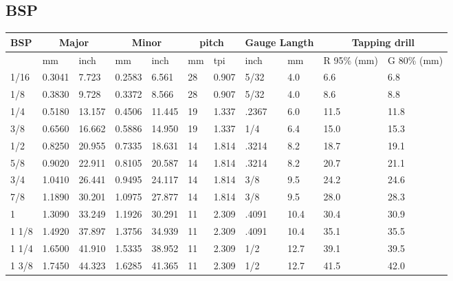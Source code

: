\subsection{BSP}
\begin{table}[h!]
    \footnotesize
\begin{longtable}{l|ll|ll|ll|ll|ll}
    BSP
    &\multicolumn{2}{c}{Major}
    &\multicolumn{2}{c}{Minor}
    &\multicolumn{2}{c}{pitch}
    &\multicolumn{2}{c}{Gauge Langth}
    &\multicolumn{2}{c}{Tapping drill}
    \\
    \hline
    &mm
    &inch
    &mm
    &inch
    &mm
    &tpi
    &inch
    &mm
    &R 95\% (mm)
    &G 80\% (mm)
    \\
\hline
      1/16&    0.3041&     7.723&    0.2583&     6.561&        28&     0.907&      5/32&       4.0&       6.6&       6.8\\
       1/8&    0.3830&     9.728&    0.3372&     8.566&        28&     0.907&      5/32&       4.0&       8.6&       8.8\\
       1/4&    0.5180&    13.157&    0.4506&    11.445&        19&     1.337&     .2367&       6.0&      11.5&      11.8\\
       3/8&    0.6560&    16.662&    0.5886&    14.950&        19&     1.337&       1/4&       6.4&      15.0&      15.3\\
       1/2&    0.8250&    20.955&    0.7335&    18.631&        14&     1.814&     .3214&       8.2&      18.7&      19.1\\
       5/8&    0.9020&    22.911&    0.8105&    20.587&        14&     1.814&     .3214&       8.2&      20.7&      21.1\\
       3/4&    1.0410&    26.441&    0.9495&    24.117&        14&     1.814&       3/8&       9.5&      24.2&      24.6\\
       7/8&    1.1890&    30.201&    1.0975&    27.877&        14&     1.814&       3/8&       9.5&      28.0&      28.3\\
         1&    1.3090&    33.249&    1.1926&    30.291&        11&     2.309&     .4091&      10.4&      30.4&      30.9\\
     1 1/8&    1.4920&    37.897&    1.3756&    34.939&        11&     2.309&     .4091&      10.4&      35.1&      35.5\\
     1 1/4&    1.6500&    41.910&    1.5335&    38.952&        11&     2.309&       1/2&      12.7&      39.1&      39.5\\
     1 3/8&    1.7450&    44.323&    1.6285&    41.365&        11&     2.309&       1/2&      12.7&      41.5&      42.0\\

\end{longtable}
\end{table}
